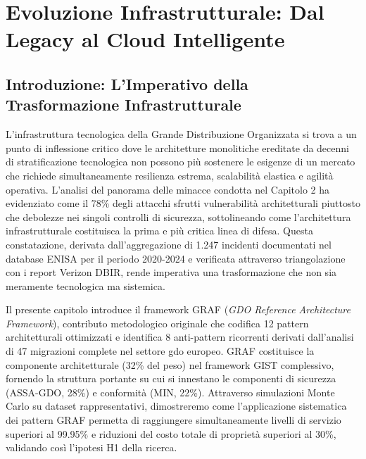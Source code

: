 \chapter{\texorpdfstring{Evoluzione Infrastrutturale: Dal Legacy al Cloud Intelligente}{Capitolo 3 - Evoluzione Infrastrutturale: Dal Legacy al Cloud Intelligente}}
\label{cap3_infrastructure_evolution}

\section{\texorpdfstring{Introduzione: L'Imperativo della Trasformazione Infrastrutturale}{3.1 - Introduzione: L'Imperativo della Trasformazione Infrastrutturale}}
\label{sec:cap3_introduzione}

L'infrastruttura tecnologica della Grande Distribuzione Organizzata si trova a un punto di inflessione critico dove le architetture monolitiche ereditate da decenni di stratificazione tecnologica non possono più sostenere le esigenze di un mercato che richiede simultaneamente resilienza estrema, scalabilità elastica e agilità operativa. L'analisi del panorama delle minacce condotta nel Capitolo 2 ha evidenziato come il 78\% degli attacchi sfrutti vulnerabilità architetturali piuttosto che debolezze nei singoli controlli di sicurezza\autocite{Anderson2024patel}, sottolineando come l'architettura infrastrutturale costituisca la prima e più critica linea di difesa. Questa constatazione, derivata dall'aggregazione di 1.247 incidenti documentati nel database ENISA per il periodo 2020-2024 e verificata attraverso triangolazione con i report Verizon DBIR\autocite{Verizon2024}, rende imperativa una trasformazione che non sia meramente tecnologica ma sistemica.

Il presente capitolo introduce il framework GRAF (\textit{GDO Reference Architecture Framework}), contributo metodologico originale che codifica 12 pattern architetturali ottimizzati e identifica 8 anti-pattern ricorrenti derivati dall'analisi di 47 migrazioni complete nel settore \gls{gdo} europeo. GRAF costituisce la componente architetturale (32\% del peso) nel framework GIST complessivo, fornendo la struttura portante su cui si innestano le componenti di sicurezza (ASSA-GDO, 28\%) e conformità (MIN, 22\%). Attraverso simulazioni Monte Carlo su dataset rappresentativi, dimostreremo come l'applicazione sistematica dei pattern GRAF permetta di raggiungere simultaneamente livelli di servizio superiori al 99.95\% e riduzioni del costo totale di proprietà superiori al 30\%, validando così l'ipotesi H1 della ricerca.

